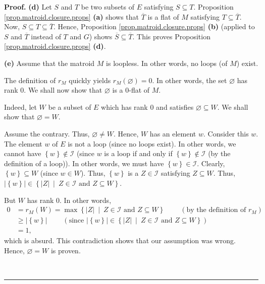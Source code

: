 \documentclass[numbers=enddot,12pt,final,onecolumn,notitlepage]{scrartcl}%
\theoremstyle{definition}
\newenvironment{proof}[1][Proof]{\noindent\textbf{#1.} }{\ \rule{0.5em}{0.5em}}
\begin{document}
\begin{proof}
\textbf{(d)} Let $S$ and $T$ be two subsets of $E$ satisfying $S\subseteq T$.
Proposition \ref{prop.matroid.closure.props} \textbf{(a)} shows that
$\overline{T}$ is a flat of $M$ satisfying $T\subseteq\overline{T}$. Now,
$S\subseteq T\subseteq\overline{T}$. Hence, Proposition
\ref{prop.matroid.closure.props} \textbf{(b)} (applied to $S$ and
$\overline{T}$ instead of $T$ and $G$) shows $\overline{S}\subseteq
\overline{T}$. This proves Proposition \ref{prop.matroid.closure.props}
\textbf{(d)}.

\textbf{(e)} Assume that the matroid $M$ is loopless. In other words, no loops
(of $M$) exist.

The definition of $r_{M}$ quickly yields $r_{M}\left(  \varnothing\right)
=0$. In other words, the set $\varnothing$ has rank $0$. We shall now show
that $\varnothing$ is a $0$-flat of $M$.

Indeed, let $W$ be a subset of $E$ which has rank $0$ and satisfies
$\varnothing\subseteq W$. We shall show that $\varnothing=W$.

Assume the contrary. Thus, $\varnothing\neq W$. Hence, $W$ has an element $w$.
Consider this $w$. The element $w$ of $E$ is not a loop (since no loops
exist). In other words, we cannot have $\left\{  w\right\}  \notin\mathcal{I}$
(since $w$ is a loop if and only if $\left\{  w\right\}  \notin\mathcal{I}$
(by the definition of a loop)). In other words, we must have $\left\{
w\right\}  \in\mathcal{I}$. Clearly, $\left\{  w\right\}  \subseteq W$ (since
$w\in W$). Thus, $\left\{  w\right\}  $ is a $Z\in\mathcal{I}$ satisfying
$Z\subseteq W$. Thus, $\left\vert \left\{  w\right\}  \right\vert \in\left\{
\left\vert Z\right\vert \ \mid\ Z\in\mathcal{I}\text{ and }Z\subseteq
W\right\}  $.

But $W$ has rank $0$. In other words,%
\begin{align*}
0  &  =r_{M}\left(  W\right)  =\max\left\{  \left\vert Z\right\vert
\ \mid\ Z\in\mathcal{I}\text{ and }Z\subseteq W\right\}
\ \ \ \ \ \ \ \ \ \ \left(  \text{by the definition of }r_{M}\right) \\
&  \geq\left\vert \left\{  w\right\}  \right\vert \ \ \ \ \ \ \ \ \ \ \left(
\text{since }\left\vert \left\{  w\right\}  \right\vert \in\left\{  \left\vert
Z\right\vert \ \mid\ Z\in\mathcal{I}\text{ and }Z\subseteq W\right\}  \right)
\\
&  =1,
\end{align*}
which is absurd. This contradiction shows that our assumption was wrong.
Hence, $\varnothing=W$ is proven.


\end{proof}
\end{document}
